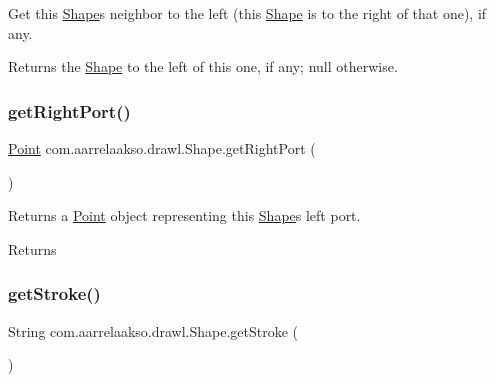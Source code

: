 Get this \hyperlink{classcom_1_1aarrelaakso_1_1drawl_1_1_shape}{Shape}\textquotesingle{}s neighbor to the left (this \hyperlink{classcom_1_1aarrelaakso_1_1drawl_1_1_shape}{Shape} is to the right of that one), if any. 

\begin{DoxyReturn}{Returns}
the \hyperlink{classcom_1_1aarrelaakso_1_1drawl_1_1_shape}{Shape} to the left of this one, if any; {\ttfamily null} otherwise. 
\end{DoxyReturn}
\mbox{\label{classcom_1_1aarrelaakso_1_1drawl_1_1_shape_a319c78d425ec91e1aef1072a95e349ad}} 
\subsubsection{\texorpdfstring{get\+Right\+Port()}{getRightPort()}}
{\footnotesize\ttfamily \hyperlink{classcom_1_1aarrelaakso_1_1drawl_1_1_point}{Point} com.\+aarrelaakso.\+drawl.\+Shape.\+get\+Right\+Port (\begin{DoxyParamCaption}{ }\end{DoxyParamCaption})\hspace{0.3cm}{\ttfamily [inherited]}}



Returns a \hyperlink{classcom_1_1aarrelaakso_1_1drawl_1_1_point}{Point} object representing this \hyperlink{classcom_1_1aarrelaakso_1_1drawl_1_1_shape}{Shape}\textquotesingle{}s left port. 

\begin{DoxyReturn}{Returns}

\end{DoxyReturn}
\mbox{\label{classcom_1_1aarrelaakso_1_1drawl_1_1_shape_a4e1d54c7e161e3af5053939ddefdf9e6}} 
\subsubsection{\texorpdfstring{get\+Stroke()}{getStroke()}}
{\footnotesize\ttfamily String com.\+aarrelaakso.\+drawl.\+Shape.\+get\+Stroke (\begin{DoxyParamCaption}{ }\end{DoxyParamCaption})\hspace{0.3cm}{\ttfamily [inherited]}}



